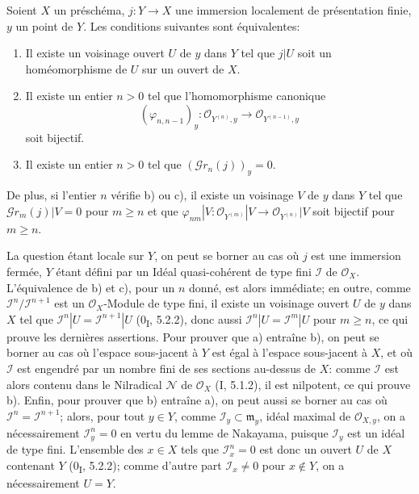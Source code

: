 \begin{proposition}[16.1.9]
\label{IV.16.1.9}
Soient $X$ un préschéma, $j:Y\to X$ une immersion localement de présentation
finie, $y$ un point de $Y$. Les conditions suivantes sont équivalentes:
\begin{enumerate}
\item[(a)] Il existe un voisinage ouvert $U$ de $y$ dans $Y$ tel que $j|U$ soit
un homéomorphisme de $U$ sur un ouvert de $X$.
\item[(b)] Il existe un entier $n>0$ tel que l'homomorphisme canonique
\[
  (\varphi_{n,n-1})_y:
  \mathcal{O}_{Y^{(n)},y}\longrightarrow\mathcal{O}_{Y^{(n-1)},y}
\]
soit bijectif.
\item[(c)] Il existe un entier $n>0$ tel que
$(\mathscr{G}r_n(j))_y=0$.
\end{enumerate}
De plus, si l'entier $n$ vérifie b) ou c), il existe un voisinage $V$ de $y$
dans $Y$ tel que $\mathscr{G}r_m(j)|V=0$ pour $m\geq n$ et que
$\varphi_{nm}|V:\mathcal{O}_{Y^{(m)}}|V\to\mathcal{O}_{Y^{(n)}}|V$ soit
bijectif pour $m\geq n$.
\end{proposition}

La question étant locale sur $Y$, on peut se borner au cas où $j$ est une
immersion fermée, $Y$ étant défini par un Idéal quasi-cohérent de type fini
$\mathscr{I}$ de $\mathcal{O}_X$. L'équivalence de b) et c), pour un $n$ donné,
est alors immédiate; en outre, comme
$\mathscr{I}^n/\mathscr{I}^{n+1}$ est un $\mathcal{O}_X$-Module de type fini,
il existe un voisinage ouvert $U$ de $y$ dans $X$ tel que
$\mathscr{I}^n|U=\mathscr{I}^{n+1}|U$ (0\textsubscript{I}, 5.2.2), donc aussi
$\mathscr{I}^n|U=\mathscr{I}^m|U$ pour $m\geq n$, ce qui prouve les dernières
assertions. Pour prouver que a) entraîne b), on peut se borner au cas où
l'espace sous-jacent à $Y$ est égal à l'espace sous-jacent à $X$, et où
$\mathscr{I}$ est engendré par un nombre fini de ses sections au-dessus de $X$:
comme $\mathscr{I}$ est alors contenu dans le Nilradical $\mathscr{N}$ de
$\mathcal{O}_X$ (I, 5.1.2), il est nilpotent, ce qui prouve b). Enfin, pour
prouver que b) entraîne a), on peut aussi se borner au cas où
$\mathscr{I}^n=\mathscr{I}^{n+1}$; alors, pour tout $y\in Y$, comme
$\mathscr{I}_y\subset\mathfrak{m}_y$, idéal maximal de
$\mathcal{O}_{X,y}$, on a nécessairement $\mathscr{I}_y^n=0$ en vertu du
lemme de Nakayama, puisque $\mathscr{I}_y$ est un idéal de type fini.
L'ensemble des $x\in X$ tels que $\mathscr{I}_x^n=0$ est donc un ouvert $U$ de
$X$ contenant $Y$ (0\textsubscript{I}, 5.2.2); comme d'autre part
$\mathscr{I}_x\neq 0$ pour $x\notin Y$, on a nécessairement $U=Y$.

